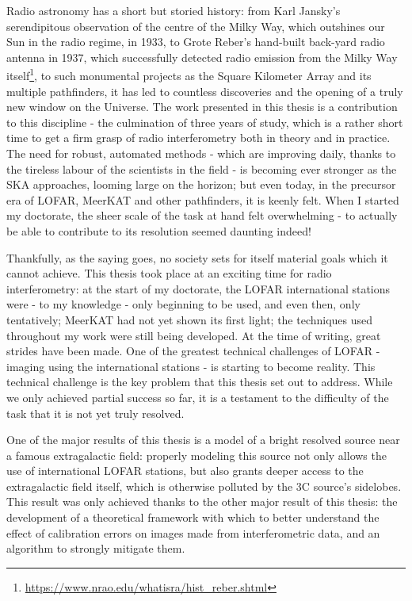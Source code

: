 \pg
Radio astronomy has a short but storied history: from Karl Jansky's serendipitous observation of the centre of the Milky Way, which outshines our Sun in the radio regime, in 1933, to Grote Reber's hand-built back-yard radio antenna in 1937, which successfully detected radio emission from the Milky Way itself\footnote{\url{https://www.nrao.edu/whatisra/hist_reber.shtml}}, to such monumental projects as the Square Kilometer Array and its multiple pathfinders, it has led to countless discoveries and the opening of a truly new window on the Universe. The work presented in this thesis is a contribution to this discipline - the culmination of three years of study, which is a rather short time to get a firm grasp of radio interferometry both in theory and in practice. The need for robust, automated methods - which are improving daily, thanks to the tireless labour of the scientists in the field - is becoming ever stronger as the SKA approaches, looming large on the horizon; but even today, in the precursor era of LOFAR, MeerKAT and other pathfinders, it is keenly felt. When I started my doctorate, the sheer scale of the task at hand felt overwhelming - to actually be able to contribute to its resolution seemed daunting indeed!

\pg
Thankfully, as the saying goes, no society sets for itself material goals which it cannot achieve. This thesis took place at an exciting time for radio interferometry: at the start of my doctorate, the LOFAR international stations were - to my knowledge - only beginning to be used, and even then, only tentatively; MeerKAT had not yet shown its first light; the techniques used throughout my work were still being developed. At the time of writing, great strides have been made. One of the greatest technical challenges of LOFAR - imaging using the international stations - is starting to become reality. This technical challenge is the key problem that this thesis set out to address. While we only achieved partial success so far, it is a testament to the difficulty of the task that it is not yet truly resolved.

\pg
One of the major results of this thesis is a model of a bright resolved source near a famous extragalactic field: properly modeling this source not only allows the use of international LOFAR stations, but also grants deeper access to the extragalactic field itself, which is otherwise polluted by the 3C source's sidelobes. This result was only achieved thanks to the other major result of this thesis: the development of a theoretical framework with which to better understand the effect of calibration errors on images made from interferometric data, and an algorithm to strongly mitigate them. 

